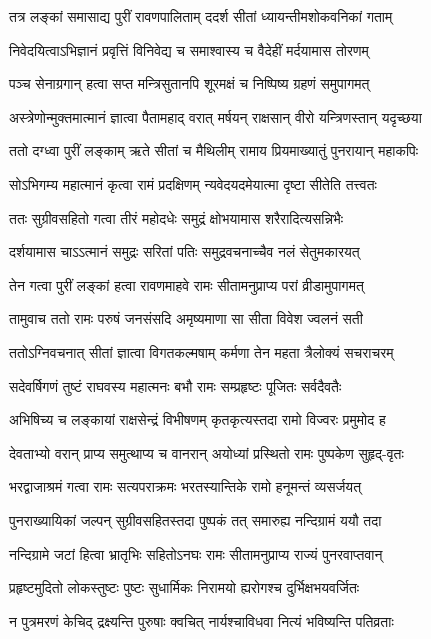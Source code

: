 \twolineshloka
{तत्र लङ्कां समासाद्य पुरीं रावणपालिताम्}
{ददर्श सीतां ध्यायन्तीमशोकवनिकां गताम्}%

\twolineshloka
{निवेदयित्वाऽभिज्ञानं प्रवृत्तिं विनिवेद्य च}
{समाश्वास्य च वैदेहीं मर्दयामास तोरणम्}%

\twolineshloka
{पञ्च सेनाग्रगान् हत्वा सप्त मन्त्रिसुतानपि}
{शूरमक्षं च निष्पिष्य ग्रहणं समुपागमत्}%

\twolineshloka
{अस्त्रेणोन्मुक्तमात्मानं ज्ञात्वा पैतामहाद् वरात्}
{मर्षयन् राक्षसान् वीरो यन्त्रिणस्तान् यदृच्छया}%

\twolineshloka
{ततो दग्ध्वा पुरीं लङ्काम् ऋते सीतां च मैथिलीम्}
{रामाय प्रियमाख्यातुं पुनरायान् महाकपिः}%

\twolineshloka
{सोऽभिगम्य महात्मानं कृत्वा रामं प्रदक्षिणम्}
{न्यवेदयदमेयात्मा दृष्टा सीतेति तत्त्वतः}%

\twolineshloka
{ततः सुग्रीवसहितो गत्वा तीरं महोदधेः}
{समुद्रं क्षोभयामास शरैरादित्यसन्निभैः}%

\twolineshloka
{दर्शयामास चाऽऽत्मानं समुद्रः सरितां पतिः}
{समुद्रवचनाच्चैव नलं सेतुमकारयत्}%

\twolineshloka
{तेन गत्वा पुरीं लङ्कां हत्वा रावणमाहवे}
{रामः सीतामनुप्राप्य परां व्रीडामुपागमत्}%

\twolineshloka
{तामुवाच ततो रामः परुषं जनसंसदि}
{अमृष्यमाणा सा सीता विवेश ज्वलनं सती}%

\twolineshloka
{ततोऽग्निवचनात् सीतां ज्ञात्वा विगतकल्मषाम्}
{कर्मणा तेन महता त्रैलोक्यं सचराचरम्}%

\twolineshloka
{सदेवर्षिगणं तुष्टं राघवस्य महात्मनः}
{बभौ रामः सम्प्रहृष्टः पूजितः सर्वदैवतैः}%

\twolineshloka
{अभिषिच्य च लङ्कायां राक्षसेन्द्रं विभीषणम्}
{कृतकृत्यस्तदा रामो विज्वरः प्रमुमोद ह}%

\twolineshloka
{देवताभ्यो वरान् प्राप्य समुत्थाप्य च वानरान्}
{अयोध्यां प्रस्थितो रामः पुष्पकेण सुहृद्-वृतः}%

\twolineshloka
{भरद्वाजाश्रमं गत्वा रामः सत्यपराक्रमः}
{भरतस्यान्तिके रामो हनूमन्तं व्यसर्जयत्}%

\twolineshloka
{पुनराख्यायिकां जल्पन् सुग्रीवसहितस्तदा}
{पुष्पकं तत् समारुह्य नन्दिग्रामं ययौ तदा}%

\twolineshloka
{नन्दिग्रामे जटां हित्वा भ्रातृभिः सहितोऽनघः}
{रामः सीतामनुप्राप्य राज्यं पुनरवाप्तवान्}%

\twolineshloka
{प्रहृष्टमुदितो लोकस्तुष्टः पुष्टः सुधार्मिकः}
{निरामयो ह्यरोगश्च दुर्भिक्षभयवर्जितः}%

\twolineshloka
{न पुत्रमरणं केचिद् द्रक्ष्यन्ति पुरुषाः क्वचित्}
{नार्यश्चाविधवा नित्यं भविष्यन्ति पतिव्रताः}%

